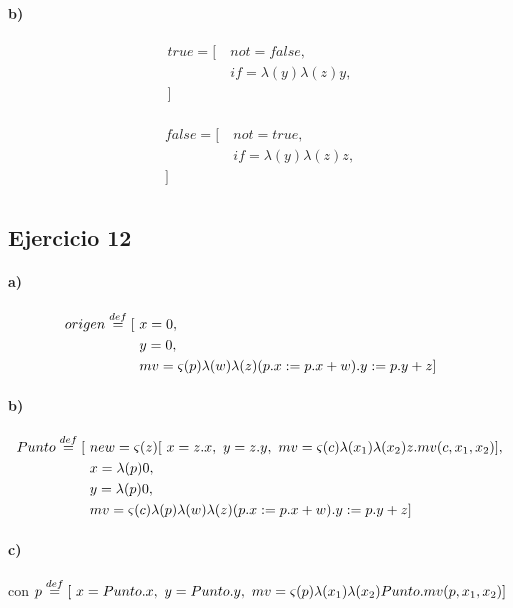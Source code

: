 \documentclass[10pt,a4paper]{article}
\begin{document}
\paragraph{b)}
\begin{multicols}{2}
\begin{align*}
true = [~&not = false,  \\
&if = \lambda(y)\lambda(z)y, \\
]~& \\
\end{align*}

\begin{align*}
false = [~&not = true,  \\
&if = \lambda(y)\lambda(z)z, \\
]~& \\
\end{align*}
\end{multicols}
\setlength{\columnsep}{5mm}
\subsection{Ejercicio 12}
\paragraph{a)}
\begin{align*}
origen \overset{def}{=} [~& x = 0, \\
 & y = 0, \\
 & mv = \varsigma(p)\lambda(w)\lambda(z) (p.x:=p.x+w).y:=p.y+z
 ]~& \\
\end{align*}
\paragraph{b)}
\begin{align*}
Punto \overset{def}{=} [~& new = \varsigma(z)[~x= z.x,~y = z.y,~ mv = \varsigma(c)\lambda(x_1)\lambda(x_2) z.mv(c,x_1,x_2)]
, \\
& x = \lambda(p)0, \\
& y = \lambda(p)0, \\
& mv = \varsigma(c)\lambda(p)\lambda(w)\lambda(z) (p.x:=p.x+w).y:=p.y+z ] \\
\end{align*}

\paragraph{c)}
	\vspace{5mm}
	\begin{center}\small
		\begin{scprooftree}
		\def\extraVskip{5pt}


    \RightLabel{[Sel]}
		\end{scprooftree}    
	\end{center}
	con $p \overset{def}{=} [~x=Punto.x,~y = Punto.y,~ mv = \varsigma(p)\lambda(x_1)\lambda(x_2) Punto.mv(p,x_1,x_2)]$
\end{document}
